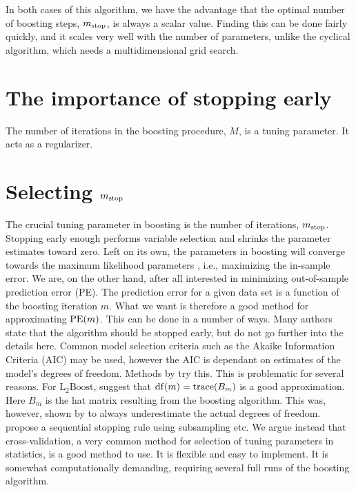 In both cases of this algorithm, we have the advantage that the optimal number of boosting steps, $m_{\text{stop}}$, is always a scalar value. Finding this can be done fairly quickly, and it scales very well with the number of parameters, unlike the cyclical algorithm, which needs a multidimensional grid search.


\section{The importance of stopping early}
The number of iterations in the boosting procedure, $M$, is a tuning parameter. It acts as a regularizer.

\section{Selecting $m_{\text{stop}}$}
The crucial tuning parameter in boosting is the number of iterations, $m_{\text{stop}}$. Stopping early enough performs variable selection and shrinks the parameter estimates toward zero. Left on its own, the parameters in boosting will converge towards the maximum likelihood parameters , i.e., maximizing the in-sample error. We are, on the other hand, after all interested in minimizing out-of-sample prediction error (PE). The prediction error for a given data set is a function of the boosting iteration $m$. What we want is therefore a good method for approximating $\operatorname{PE}(m)$. This can be done in a number of ways. Many authors state that the algorithm should be stopped early, but do not go further into the details here. Common model selection criteria such as the Akaike Information Criteria (AIC) may be used, however the AIC is dependant on estimates of the model's degrees of freedom. Methods by \citet{chang2010} try this. This is problematic for several reasons. For $\text{L}_2\text{Boost}$, \citet{buhlmann2007} suggest that $\operatorname{df}(m)=\operatorname{trace}(B_m)$ is a good approximation. Here $B_m$ is the hat matrix resulting from the boosting algorithm. This was, however, shown by \citet{hastie2007} to always underestimate the actual degrees of freedom. \citet{mayr-hofner} propose a sequential stopping rule using subsampling etc. We argue instead that cross-validation, a very common method for selection of tuning parameters in statistics, is a good method to use. It is flexible and easy to implement. It is somewhat computationally demanding, requiring several full runs of the boosting algorithm.

